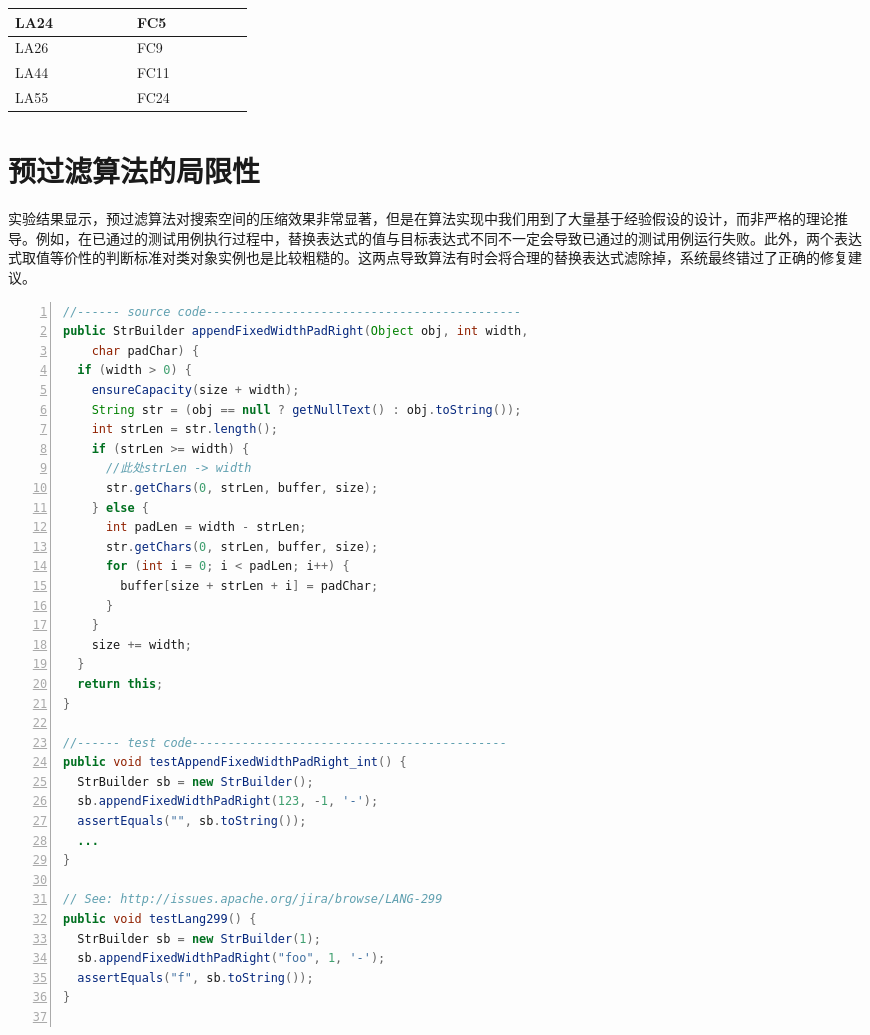 \begin{table}
\begin{tabular}{|l|l|l|l|l|l|l|l|l|l|l|l|}
		LA24  & \textbullet &             &     &       &             & FC5  &             & \textbullet &             &             &             \\ \hline
		LA26  & \textbullet &             &     &       &             & FC9  & \textbullet &             &             &             & \textbullet \\ \hline
		LA44  &             & \textbullet &     &       &             & FC11 & \textbullet &             &             &             &             \\ \hline
		LA55  &             & \textbullet &     &       & \textbullet & FC24 & \textbullet &             &             &             &             \\ \hline
	\end{tabular}
\end{table}


\section{预过滤算法的局限性}

实验结果显示，预过滤算法对搜索空间的压缩效果非常显著，但是在算法实现中我们用到了大量基于经验假设的设计，而非严格的理论推导。例如，在已通过的测试用例执行过程中，替换表达式的值与目标表达式不同不一定会导致已通过的测试用例运行失败。此外，两个表达式取值等价性的判断标准对类对象实例也是比较粗糙的。这两点导致算法有时会将合理的替换表达式滤除掉，系统最终错过了正确的修复建议。

\begin{lstlisting}[caption=错误示例 commons-lang59/StrBuffer.java,frame=single,language=Java,numbers=left,basicstyle=\ttfamily\footnotesize,label={code:lang59}]
//------ source code--------------------------------------------
public StrBuilder appendFixedWidthPadRight(Object obj, int width,
    char padChar) {
  if (width > 0) {
    ensureCapacity(size + width);
    String str = (obj == null ? getNullText() : obj.toString());
    int strLen = str.length();
    if (strLen >= width) {
      //此处strLen -> width
      str.getChars(0, strLen, buffer, size);
    } else {
      int padLen = width - strLen;
      str.getChars(0, strLen, buffer, size);
      for (int i = 0; i < padLen; i++) {
        buffer[size + strLen + i] = padChar;
      }
    }
    size += width;
  }
  return this;
}

//------ test code--------------------------------------------
public void testAppendFixedWidthPadRight_int() {
  StrBuilder sb = new StrBuilder();
  sb.appendFixedWidthPadRight(123, -1, '-');
  assertEquals("", sb.toString());  
  ...
}

// See: http://issues.apache.org/jira/browse/LANG-299
public void testLang299() {
  StrBuilder sb = new StrBuilder(1);
  sb.appendFixedWidthPadRight("foo", 1, '-');
  assertEquals("f", sb.toString());
}
  
\end{lstlisting}

